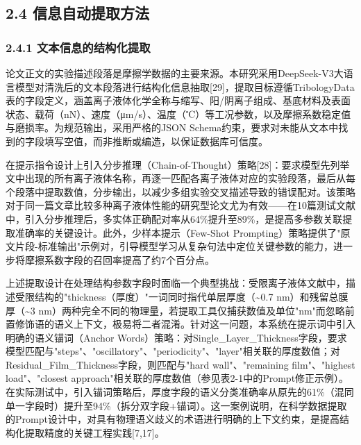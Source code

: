 \hypertarget{ux4fe1ux606fux81eaux52a8ux63d0ux53d6ux65b9ux6cd5}{%
\subsection{2.4 信息自动提取方法}\label{ux4fe1ux606fux81eaux52a8ux63d0ux53d6ux65b9ux6cd5}}

\hypertarget{ux6587ux672cux4fe1ux606fux7684ux7ed3ux6784ux5316ux63d0ux53d6}{%
\subsubsection{2.4.1 文本信息的结构化提取}\label{ux6587ux672cux4fe1ux606fux7684ux7ed3ux6784ux5316ux63d0ux53d6}}

论文正文的实验描述段落是摩擦学数据的主要来源。本研究采用DeepSeek-V3大语言模型对清洗后的文本段落进行结构化信息抽取{[}29{]}，提取目标遵循TribologyData表的字段定义，涵盖离子液体化学全称与缩写、阳/阴离子组成、基底材料及表面状态、载荷（nN）、速度（μm/s）、温度（℃）等工况参数，以及摩擦系数稳定值与磨损率。为规范输出，采用严格的JSON Schema约束，要求对未能从文本中找到的字段填写空值，而非推断或编造，以保证数据库可信度。

在提示指令设计上引入分步推理（Chain-of-Thought）策略{[}28{]}：要求模型先列举文中出现的所有离子液体名称，再逐一匹配各离子液体对应的实验段落，最后从每个段落中提取数值，分步输出，以减少多组实验交叉描述导致的错误配对。该策略对于同一篇文章比较多种离子液体性能的研究型论文尤为有效------在10篇测试文献中，引入分步推理后，多实体正确配对率从64\%提升至89\%，是提高多参数关联提取准确率的关键设计。此外，少样本提示（Few-Shot Prompting）策略提供了"原文片段-标准输出"示例对，引导模型学习从复杂句法中定位关键参数的能力，进一步将摩擦系数字段的召回率提高了约7个百分点。

上述提取设计在处理结构参数字段时面临一个典型挑战：受限离子液体文献中，描述受限结构的"thickness（厚度）"一词同时指代单层厚度（\textasciitilde0.7 nm）和残留总膜厚（\textasciitilde3 nm）两种完全不同的物理量，若提取工具仅捕获数值及单位"nm"而忽略前置修饰语的语义上下文，极易将二者混淆。针对这一问题，本系统在提示词中引入明确的语义锚词（Anchor Words）策略：对Single\_Layer\_Thickness字段，要求模型匹配与"steps"、"oscillatory"、"periodicity"、"layer"相关联的厚度数值；对Residual\_Film\_Thickness字段，则匹配与"hard wall"、"remaining film"、"highest load"、"closest approach"相关联的厚度数值（参见表2-1中的Prompt修正示例）。在实际测试中，引入锚词策略后，厚度字段的语义分类准确率从原先的61\%（混同单一字段时）提升至94\%（拆分双字段+锚词）。这一案例说明，在科学数据提取的Prompt设计中，对具有物理语义歧义的术语进行明确的上下文约束，是提高结构化提取精度的关键工程实践{[}7,17{]}。

